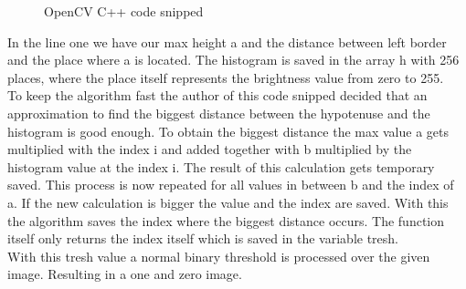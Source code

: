 \begin{figure}[ht]
	\centering
	
	\caption{OpenCV C++ code snipped}
	\label{theory:code}
\end{figure}
In the line one we have our max height a and the distance between left border and the place where a is located. The histogram is saved in the array h with 256 places, where the place itself represents the brightness value from zero to 255.\\
To keep the algorithm fast the author of this code snipped decided that an approximation to find the biggest distance between the hypotenuse and the histogram is good enough. To obtain the biggest distance the max value a gets multiplied with the index i and added together with b multiplied by the histogram value at the index i. The result of this calculation gets temporary saved. This process is now repeated for all values in between b and the index of a. If the new calculation is bigger the value and the index are saved. With this the algorithm saves the index where the biggest distance occurs. The function itself only returns the index itself which is saved in the variable tresh. \\
With this tresh value a normal binary threshold is processed over the given image. Resulting in a one and zero image.   
\newpage